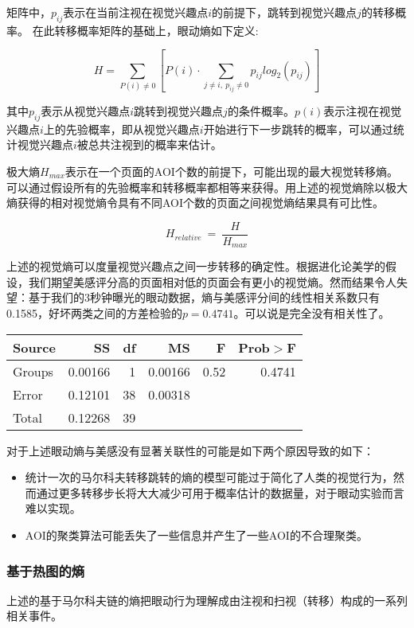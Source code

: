 矩阵中，$p_{ij}$表示在当前注视在视觉兴趣点$i$的前提下，跳转到视觉兴趣点$j$的转移概率。
在此转移概率矩阵的基础上，眼动熵如下定义:

$$H = \sum_{P(i)\neq0}[P(i)\cdot \sum_{j\neq i,~p_{ij}\neq0} p_{ij}log_2(p_{ij})]$$

其中$p_{ij}$表示从视觉兴趣点$i$跳转到视觉兴趣点$j$的条件概率。$p(i)$表示注视在视觉兴趣点$i$上的先验概率，即从视觉兴趣点$i$开始进行下一步跳转的概率，可以通过统计视觉兴趣点$i$被总共注视到的概率来估计。

极大熵$H_{max}$表示在一个页面的AOI个数的前提下，可能出现的最大视觉转移熵。可以通过假设所有的先验概率和转移概率都相等来获得。用上述的视觉熵除以极大熵获得的相对视觉熵令具有不同AOI个数的页面之间视觉熵结果具有可比性。

$$H_{relative}~=~\frac{H}{H_{max}}$$

上述的视觉熵可以度量视觉兴趣点之间一步转移的确定性。根据进化论美学的假设，我们期望美感评分高的页面相对低的页面会有更小的视觉熵。然而结果令人失望：基于我们的3秒钟曝光的眼动数据，熵与美感评分间的线性相关系数只有0.1585，好坏两类之间的方差检验的$p=0.4741$。可以说是完全没有相关性了。

\begin{table}[H]
\centering
\begin{tabular}{lrrrrr}
  \hline
  Source&SS&df&MS&F&Prob$>$F\\ \hline
  Groups&0.00166&1&0.00166&0.52&0.4741\\
  Error&0.12101&38&0.00318&&\\
  Total&0.12268&39&&&\\
  \hline
\end{tabular}
\end{table}

对于上述眼动熵与美感没有显著关联性的可能是如下两个原因导致的如下：

\begin{itemize}
  \item 统计一次的马尔科夫转移跳转的熵的模型可能过于简化了人类的视觉行为，然而通过更多转移步长将大大减少可用于概率估计的数据量，对于眼动实验而言难以实现。
  \item AOI的聚类算法可能丢失了一些信息并产生了一些AOI的不合理聚类。
\end{itemize}

\subsubsection{基于热图的熵}
上述的基于马尔科夫链的熵把眼动行为理解成由注视和扫视（转移）构成的一系列相关事件。

